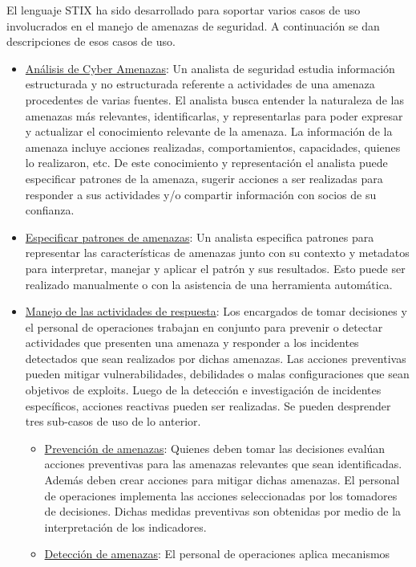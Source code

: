 El lenguaje STIX ha sido desarrollado para soportar varios casos de uso involucrados en el 
manejo de amenazas de seguridad. A continuación se dan descripciones de esos 
casos de uso.
\begin{itemize}
  \item \underline{Análisis de Cyber Amenazas}: Un analista de seguridad estudia información 
  estructurada y no estructurada referente a actividades de una amenaza 
  procedentes de varias fuentes. El analista busca entender la naturaleza de las 
  amenazas más relevantes, identificarlas, y representarlas para poder expresar 
  y actualizar el conocimiento relevante de la amenaza. La información de la 
  amenaza incluye acciones realizadas, comportamientos, capacidades, quienes lo 
  realizaron, etc. De este conocimiento y representación el analista puede 
  especificar patrones de la amenaza, sugerir acciones a ser realizadas para 
  responder a sus actividades y/o compartir información con socios de su 
  confianza.
  \item \underline{Especificar patrones de amenazas}: Un analista especifica patrones para 
  representar las características de amenazas junto con su contexto y metadatos 
  para interpretar, manejar y aplicar el patrón y sus resultados. Esto puede ser 
  realizado manualmente o con la asistencia de una herramienta automática.
  \item \underline{Manejo de las actividades de respuesta}: Los encargados de tomar decisiones y el personal de operaciones trabajan 
  en conjunto para prevenir o detectar actividades que presenten una amenaza y 
  responder a los incidentes detectados que sean realizados por dichas amenazas. 
  Las acciones preventivas pueden mitigar vulnerabilidades, debilidades o malas 
  configuraciones que sean objetivos de exploits. Luego de la detección e 
  investigación de incidentes específicos, acciones reactivas pueden ser 
  realizadas. Se pueden desprender tres sub-casos de uso de lo anterior.
  \begin{itemize}
    \item \underline{Prevención de amenazas}: Quienes deben tomar las decisiones evalúan 
    acciones preventivas para las amenazas relevantes que sean identificadas. Además deben crear acciones para mitigar dichas amenazas. El personal de 
    operaciones implementa las acciones seleccionadas por los tomadores de 
    decisiones. Dichas medidas preventivas son obtenidas por medio de la 
    interpretación de los indicadores.
    \item \underline{Detección de amenazas}: El personal de operaciones aplica mecanismos 

\end{itemize}
\end{itemize}
